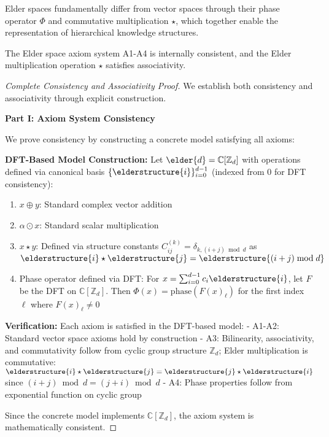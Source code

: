 Elder spaces fundamentally differ from vector spaces through their phase operator $\Phi$ and commutative multiplication $\star$, which together enable the representation of hierarchical knowledge structures.

\begin{theorem}
\label{thm:axiom_consistency}
The Elder space axiom system A1-A4 is internally consistent, and the Elder multiplication operation $\star$ satisfies associativity.
\end{theorem}

\begin{proof}[Complete Consistency and Associativity Proof]
We establish both consistency and associativity through explicit construction.

\textbf{Part I: Axiom System Consistency}

We prove consistency by constructing a concrete model satisfying all axioms:

\textbf{DFT-Based Model Construction:} Let $\elder{d} = \mathbb{C}[\mathbb{Z}_d]$ with operations defined via canonical basis $\{\elderstructure{i}\}_{i=0}^{d-1}$ (indexed from 0 for DFT consistency):
\begin{enumerate}
    \item $x \oplus y$: Standard complex vector addition
    \item $\alpha \odot x$: Standard scalar multiplication
    \item $x \star y$: Defined via structure constants $C_{ij}^{(k)} = \delta_{k, (i+j) \bmod d}$ as $\elderstructure{i} \star \elderstructure{j} = \elderstructure{(i+j) \bmod d}$
    \item Phase operator defined via DFT: For $x = \sum_{i=0}^{d-1} c_i \elderstructure{i}$, let $F$ be the DFT on $\mathbb{C}[\mathbb{Z}_d]$. Then $\Phi(x) = \text{phase}(F(x)_\ell)$ for the first index $\ell$ where $F(x)_\ell \neq 0$
\end{enumerate}

\textbf{Verification:} Each axiom is satisfied in the DFT-based model:
- A1-A2: Standard vector space axioms hold by construction
- A3: Bilinearity, associativity, and commutativity follow from cyclic group structure $\mathbb{Z}_d$; Elder multiplication is commutative: $\elderstructure{i} \star \elderstructure{j} = \elderstructure{j} \star \elderstructure{i}$ since $(i+j) \bmod d = (j+i) \bmod d$
- A4: Phase properties follow from exponential function on cyclic group

Since the concrete model implements $\mathbb{C}[\mathbb{Z}_d]$, the axiom system is mathematically consistent.


\end{proof}
